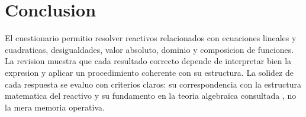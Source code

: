 \documentclass[
	spanish,
	letterpaper, oneside
]{article}
\begin{document}
%

\clearpage
\section{Conclusion}

El cuestionario permitio resolver reactivos relacionados con ecuaciones lineales y cuadraticas, desigualdades, valor absoluto, dominio y composicion de funciones. La revision muestra que cada resultado correcto depende de interpretar bien la expresion y aplicar un procedimiento coherente con su estructura. La solidez de cada respuesta se evaluo con criterios claros: su correspondencia con la estructura matematica del reactivo y su fundamento en la teoria algebraica consultada \citep{stewart2017precalculo,sullivan2013algebra}, no la mera memoria operativa.
\end{document}
